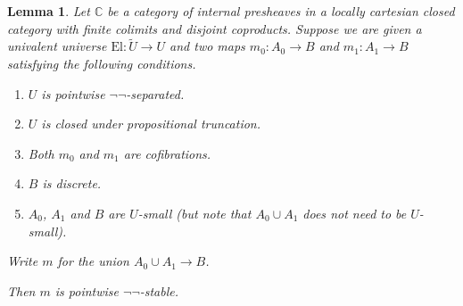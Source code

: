 \documentclass[a4paper]{amsart}
\newtheorem{lemma}[theorem]{Lemma}
\theoremstyle{definition}
\newcommand{\cat}[1]{\mathbb{#1}}
\newcommand{\catc}{\cat{C}}
\newcommand{\elu}{\mathrm{El}}
\begin{document}
\begin{lemma}
  \label{lem:vsephs}
  Let $\catc$ be a category of internal presheaves in a locally
  cartesian closed category with finite colimits and disjoint
  coproducts. Suppose we are given a univalent universe
  $\elu \colon \tilde{U} \to U$ and two maps $m_0 \colon A_0 \to B$
  and $m_1 \colon A_1 \to B$ satisfying the following conditions.
  \begin{enumerate}
  \item $U$ is pointwise $\neg \neg$-separated.
  \item $U$ is closed under propositional truncation.
  \item Both $m_0$ and $m_1$ are cofibrations.
  \item $B$ is discrete.
  \item $A_0$, $A_1$ and $B$ are $U$-small (but note that $A_0
    \cup A_1$ does \emph{not} need to be $U$-small).
  \end{enumerate}
  Write $m$ for the union $A_0 \cup A_1 \rightarrow B$.

  Then $m$ is pointwise $\neg \neg$-stable.
\end{lemma}
\end{document}

